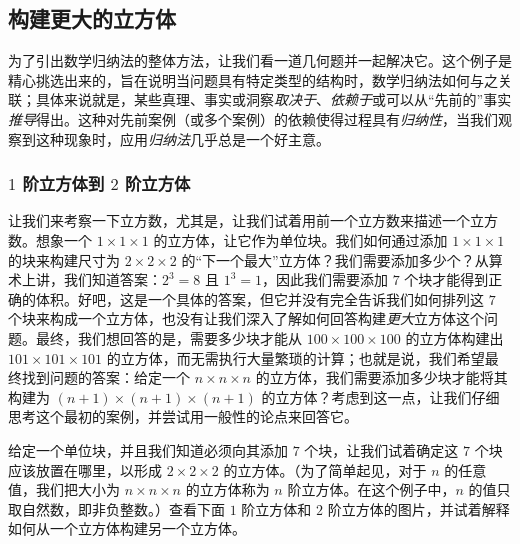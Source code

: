 \subsection{构建更大的立方体}

为了引出数学归纳法的整体方法，让我们看一道几何题并一起解决它。这个例子是精心挑选出来的，旨在说明当问题具有特定类型的结构时，数学归纳法如何与之关联；具体来说就是，某些真理、事实或洞察\emph{取决于}、\emph{依赖于}或可以从``先前的''事实\emph{推导}得出。这种对先前案例（或多个案例）的依赖使得过程具有\emph{归纳性}，当我们观察到这种现象时，应用\emph{归纳法}几乎总是一个好主意。

\subsubsection*{$1$ 阶立方体到 $2$ 阶立方体}

让我们来考察一下立方数，尤其是，让我们试着用前一个立方数来描述一个立方数。想象一个 $1 \times 1 \times 1$ 的立方体，让它作为单位块。我们如何通过添加 $1 \times 1 \times 1$ 的块来构建尺寸为 $2 \times 2 \times 2$ 的``下一个最大''立方体？我们需要添加多少个？从算术上讲，我们知道答案：$2^3 = 8$ 且 $1^3 = 1$，因此我们需要添加 $7$ 个块才能得到正确的体积。好吧，这是一个具体的答案，但它并没有完全告诉我们如何排列这 $7$ 个块来构成一个立方体，也没有让我们深入了解如何回答构建\emph{更大}立方体这个问题。最终，我们想回答的是，需要多少块才能从 $100 \times 100 \times 100$ 的立方体构建出 $101 \times 101 \times 101$ 的立方体，而无需执行大量繁琐的计算；也就是说，我们希望最终找到问题的答案：给定一个 $n \times n \times n$ 的立方体，我们需要添加多少块才能将其构建为 $(n+ 1) \times (n+ 1) \times (n+ 1)$ 的立方体？考虑到这一点，让我们仔细思考这个最初的案例，并尝试用一般性的论点来回答它。

给定一个单位块，并且我们知道必须向其添加 $7$ 个块，让我们试着确定这 $7$ 个块应该放置在哪里，以形成 $2 \times 2 \times 2$ 的立方体。（为了简单起见，对于 $n$ 的任意值，我们把大小为 $n \times n \times n$ 的立方体称为 $n$ 阶立方体。在这个例子中，$n$ 的值只取自然数，即非负整数。）查看下面 $1$ 阶立方体和 $2$ 阶立方体的图片，并试着解释如何从一个立方体构建另一个立方体。

\begin{center}
\end{center}

